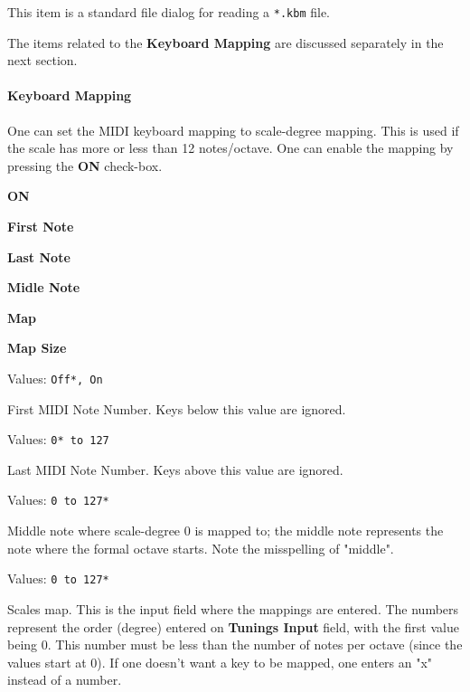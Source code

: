    This item is a standard file dialog for reading
   a \texttt{*.kbm} file.


   The items related to the \textbf{Keyboard Mapping} are discussed
   separately in the next section.

\paragraph{Keyboard Mapping}
\label{paragraph:menu_scales_keyboard_mapping}

   One can set the MIDI keyboard mapping to scale-degree mapping.
   This is used if the scale has more or less than 12 notes/octave.
   One can enable the mapping by pressing the \textbf{ON} check-box.

   \begin{enumber}
      \item \textbf{ON}
      \item \textbf{First Note}
      \item \textbf{Last Note}
      \item \textbf{Midle Note}
      \item \textbf{Map}
      \item \textbf{Map Size}
   \end{enumber}

   \setcounter{ItemCounter}{0}      %


   Values: \texttt{Off*, On}

   First MIDI Note Number.
   Keys below this value are ignored.

   Values: \texttt{0* to 127}

   Last MIDI Note Number.
   Keys above this value are ignored.

   Values: \texttt{0 to 127*}

   Middle note where scale-degree 0 is mapped to;
   the middle note represents the note where the formal octave starts.
   Note the misspelling of "middle".

   Values: \texttt{0 to 127*}

   Scales map.  This is the input field where the mappings are entered.
   The numbers represent the order (degree) entered on
   \textbf{Tunings Input} field, with the first value being 0.
   This number must be less than the number of notes per octave (since
   the values start at 0).
   If one doesn't want a key to be mapped, one enters an "x" instead of a
   number.

